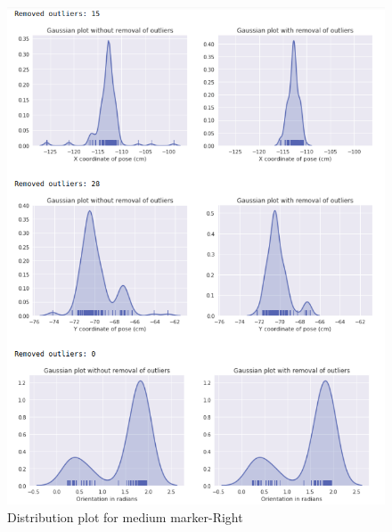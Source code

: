 \documentclass[11pt,a4paper]{article}
\begin{document}
\begin{enumerate}
\begin{figure}[H]
					\includegraphics[scale=0.6]{medium-right}
					\caption{Distribution plot for medium marker-Right}	
				\end{figure}
				

\end{enumerate}
\end{document}
